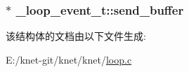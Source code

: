 \subsubsection[{send\+\_\+buffer}]{$\ast$ \+\_\+loop\+\_\+event\+\_\+t\+::send\+\_\+buffer}\label{a00023_a95cfa23b9392db798b8fbcc41f094614_a95cfa23b9392db798b8fbcc41f094614}


该结构体的文档由以下文件生成\+:\begin{DoxyCompactItemize}
\item 
E\+:/knet-\/git/knet/knet/\hyperlink{a00052}{loop.\+c}\end{DoxyCompactItemize}
